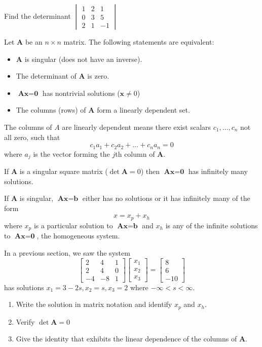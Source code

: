 \documentclass[../diffeq.tex]{subfiles}
\begin{document}
\ex Find the determinant $\begin{vmatrix}
    1 & 2 & 1\\
    0 & 3 & 5\\
    2 & 1 & -1
\end{vmatrix}$

\pagebreak
\begin{theorem}
    Let $\textbf{A}$ be an $n\times n$ matrix. The following statements are equivalent:
\begin{itemize}
    \item $\textbf{A}$ is singular (does not have an inverse).
    \item The determinant of $\textbf{A}$ is zero.
    \item $\textbf{Ax}=\textbf{0}$ has nontrivial solutions ($\textbf{x}\neq 0$)
    \item The columns (rows) of $\textbf{A}$ form a linearly dependent set.
\end{itemize} 
\end{theorem}



The columns of $A$ are linearly dependent means there exist scalars $c_1,\dots, c_n$ not all zero, such that 
\[ c_1a_1+c_2a_2+\dots + c_na_n = 0\]
where $a_j$ is the vector forming the $j$th column of $\textbf{A}$.

If $\textbf{A}$ is a singular square matrix ($\det \textbf{A}=0$) then $\textbf{Ax}=\textbf{0}$ has infinitely many solutions.

If $\textbf{A}$ is singular, $\textbf{Ax}=\textbf{b}$ either has no solutions or it has infinitely many of the form 
\[ x=x_p+x_h\]
where $x_p$ is a particular solution to $\textbf{Ax}=\textbf{b}$ and $x_h$ is any of the infinite solutions to $\textbf{Ax}=\textbf{0}$, the homogeneous system.

\ex In a previous section, we saw the system 
\[ \begin{bmatrix}
    2 & 4 & 1\\
    2 &4 & 0\\
    -4 & -8 & 1
\end{bmatrix}\begin{bmatrix}
    x_1\\x_2\\x_3
\end{bmatrix}=\begin{bmatrix}
    8\\6\\-10
\end{bmatrix}\]
has solutions $x_1=3-2s,x_2=s,x_3=2$ where $-\infty<s<\infty$.
\begin{enumerate}
    \item Write the solution in matrix notation and identify $x_p$ and $x_h$.
    \item Verify $\det \textbf{A}=0$
    \item Give the identity that exhibits the linear dependence of the columns of $\textbf{A}$.
\end{enumerate}
\end{document}
